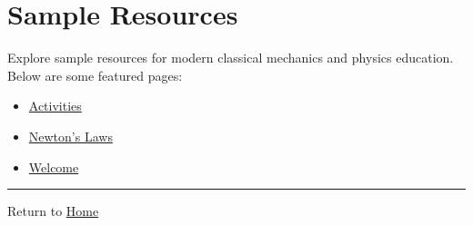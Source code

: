 \section{Sample Resources}\label{sample-resources}

Explore sample resources for modern classical mechanics and physics
education. Below are some featured pages:

\begin{itemize}
\tightlist
\item
  \href{activities.md}{Activities}
\item
  \href{newton.md}{Newton's Laws}
\item
  \href{welcome.md}{Welcome}
\end{itemize}

\begin{center}\rule{0.5\linewidth}{0.5pt}\end{center}

Return to \href{../index.md}{Home}
